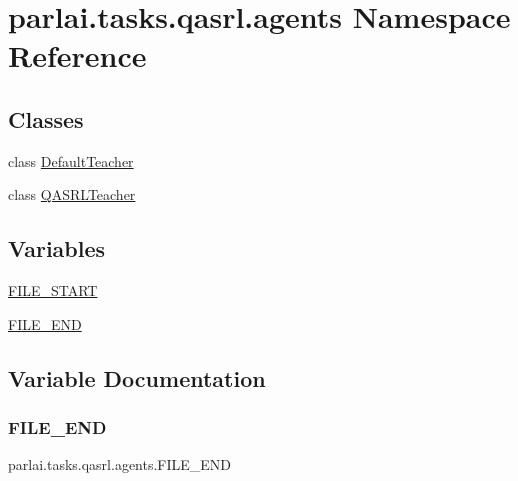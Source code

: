 \hypertarget{namespaceparlai_1_1tasks_1_1qasrl_1_1agents}{}\section{parlai.\+tasks.\+qasrl.\+agents Namespace Reference}
\label{namespaceparlai_1_1tasks_1_1qasrl_1_1agents}
\subsection*{Classes}
\begin{DoxyCompactItemize}
\item 
class \hyperlink{classparlai_1_1tasks_1_1qasrl_1_1agents_1_1DefaultTeacher}{Default\+Teacher}
\item 
class \hyperlink{classparlai_1_1tasks_1_1qasrl_1_1agents_1_1QASRLTeacher}{Q\+A\+S\+R\+L\+Teacher}
\end{DoxyCompactItemize}
\subsection*{Variables}
\begin{DoxyCompactItemize}
\item 
\hyperlink{namespaceparlai_1_1tasks_1_1qasrl_1_1agents_a4d07c0a0dd5142d9a7289fbf38dea739}{F\+I\+L\+E\+\_\+\+S\+T\+A\+RT}
\item 
\hyperlink{namespaceparlai_1_1tasks_1_1qasrl_1_1agents_ab9b6860cd069c84879bc835c7bf8bf75}{F\+I\+L\+E\+\_\+\+E\+ND}
\end{DoxyCompactItemize}


\subsection{Variable Documentation}
\mbox{\label{namespaceparlai_1_1tasks_1_1qasrl_1_1agents_ab9b6860cd069c84879bc835c7bf8bf75}} 
\subsubsection{\texorpdfstring{F\+I\+L\+E\+\_\+\+E\+ND}{FILE\_END}}
{\footnotesize\ttfamily parlai.\+tasks.\+qasrl.\+agents.\+F\+I\+L\+E\+\_\+\+E\+ND}



